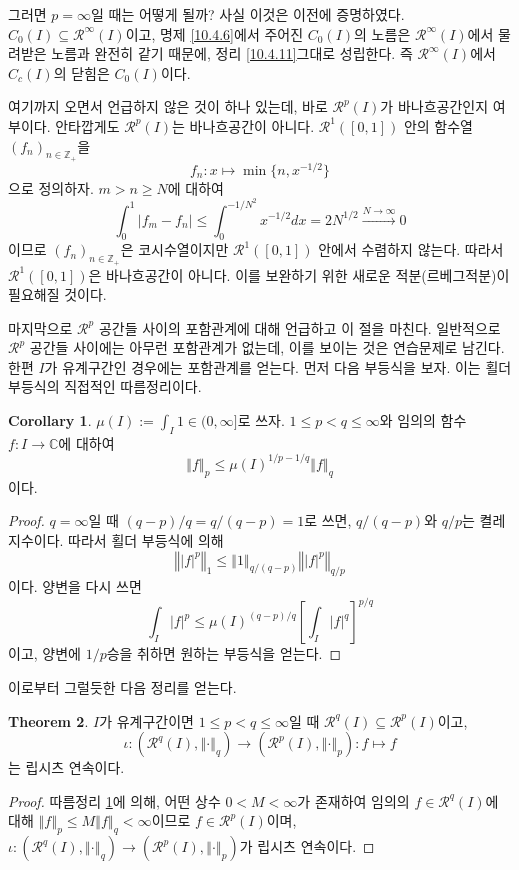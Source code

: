 \documentclass[11pt]{book}
\numberwithin{equation}{chapter}
\def\ZZ{\mathbb{Z}}
\def\CC{\mathbb{C}}
\def\calR{\mathcal{R}}
\newcommand{\abs}[1]{\left\vert#1\right\vert}
\newcommand{\norm}[1]{\left\Vert#1\right\Vert}
\newcommand{\sqbracket}[1]{\left[#1\right]}
\theoremstyle{definition}
\newtheorem{thm}{Theorem}[section]
\newtheorem{cor}[thm]{Corollary}
\begin{document}
그러면 \(p = \infty\)일 때는 어떻게 될까? 사실 이것은 이전에 증명하였다. \(C_0(I) \subseteq \calR^\infty(I)\)이고, 명제 \ref{10.4.6}에서 주어진 \(C_0(I)\)의 노름은 \(\calR^\infty(I)\)에서 물려받은 노름과 완전히 같기 때문에, 정리 \ref{10.4.11}\이 그대로 성립한다. 즉 \(\calR^\infty(I)\)에서 \(C_c(I)\)의 닫힘은 \(C_0(I)\)이다.

여기까지 오면서 언급하지 않은 것이 하나 있는데, 바로 \(\calR^p(I)\)가 바나흐공간인지 여부이다. 안타깝게도 \(\calR^p(I)\)는 바나흐공간이 아니다. \(\calR^1([0, 1])\) 안의 함수열 \((f_n)_{n \in \ZZ_+}\)을
\[
    f_n : x \mapsto \min \{n, x^{-1/2}\}
\]
으로 정의하자. \(m > n \ge N\)에 대하여
\[
\int_0^1 \abs{f_m - f_n} \le \int_0^{-1/N^2} x^{-1/2} dx = 2N^{1/2} \xrightarrow[]{N \to \infty} 0    
\]
이므로 \((f_n)_{n \in \ZZ_+}\)은 코시수열이지만 \(\calR^1([0, 1])\) 안에서 수렴하지 않는다. 따라서 \(\calR^1([0, 1])\)은 바나흐공간이 아니다. 이를 보완하기 위한 새로운 적분(르베그적분)이 필요해질 것이다.

마지막으로 \(\calR^p\) 공간들 사이의 포함관계에 대해 언급하고 이 절을 마친다. 일반적으로 \(\calR^p\) 공간들 사이에는 아무런 포함관계가 없는데, 이를 보이는 것은 연습문제로 남긴다. 한편 \(I\)가 유계구간인 경우에는 포함관계를 얻는다. 먼저 다음 부등식을 보자. 이는 횔더 부등식의 직접적인 따름정리이다.

\begin{cor} \label{13.3.19}
    \(\mu(I) := \int_I 1 \in (0, \infty]\)로 쓰자. \(1 \le p < q \le \infty\)와 임의의 함수 \(f : I \to \CC\)에 대하여
    \[
    \norm{f}_p \le \mu(I)^{1/p - 1/q} \norm{f}_q    
    \]
    이다. 
\end{cor}
\begin{proof}
    \(q = \infty\)일 때 \((q-p)/q = q/(q-p) = 1\)로 쓰면, \(q/(q-p)\)와 \(q/p\)는 켤레 지수이다. 따라서 횔더 부등식에 의해
    \[
    \norm{\abs{f}^p}_1 \le \norm{1}_{q/(q-p)} \norm{\abs{f}^p}_{q/p}   
    \]
    이다. 양변을 다시 쓰면
    \[
    \int_I \abs{f}^p \le \mu(I)^{(q-p)/q} \sqbracket{\int_I \abs{f}^q}^{p/q}    
    \]
    이고, 양변에 \(1/p\)승을 취하면 원하는 부등식을 얻는다.
\end{proof}

이로부터 그럴듯한 다음 정리를 얻는다.

\begin{thm}
    \(I\)가 유계구간이면 \(1 \le p < q \le \infty\)일 때 \(\calR^q(I) \subseteq \calR^p(I)\)이고,
    \[
        \iota : (\calR^q(I), \norm{\cdot}_q) \to (\calR^p(I), \norm{\cdot}_p) : f \mapsto f    
    \]
    는 립시츠 연속이다.
\end{thm}
\begin{proof}
    따름정리 \ref{13.3.19}에 의해, 어떤 상수 \(0 < M < \infty\)가 존재하여 임의의 \(f \in \calR^q(I)\)에 대해 \(\norm{f}_p \le M \norm{f}_q < \infty\)이므로 \(f \in \calR^p(I)\)이며, \(\iota : (\calR^q(I), \norm{\cdot}_q) \to (\calR^p(I), \norm{\cdot}_p)\)가 립시츠 연속이다.
\end{proof}
\end{document}
